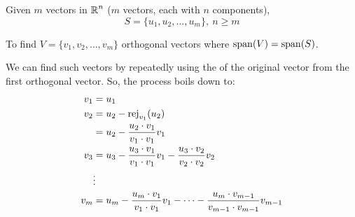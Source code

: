 \begin{theorem}\label{thm:Gram-Schmidt_Orthogonalization}
  Given $m$  vectors in $\RealNumbers^{n}$ ($m$ vectors, each with $n$ components),
  \begin{equation*}
    S = \lbrace u_{1}, u_{2}, \ldots, u_{m} \rbrace, \: n \geq m
  \end{equation*}

  To find $V = \lbrace v_{1}, v_{2}, \ldots, v_{m} \rbrace$ orthogonal vectors where $\Span(V) = \Span(S)$.

  We can find such vectors by repeatedly using the  of the original vector from the first orthogonal vector.
  So, the process boils down to:
  \begin{equation}\label{eq:Gram-Schmidt_Orthogonalization}
    \begin{aligned}
      v_{1} &= u_{1} \\
      v_{2} &= u_{2} - \Rej{u_{2}}{v_{1}} \\
      &= u_{2} - \frac{u_{2} \cdot v_{1}}{v_{1} \cdot v_{1}} v_{1} \\
      v_{3} &= u_{3} - \frac{u_{3} \cdot v_{1}}{v_{1} \cdot v_{1}} v_{1} - \frac{u_{3} \cdot v_{2}}{v_{2} \cdot v_{2}} v_{2} \\
      &\vdots \\
      v_{m} &= u_{m} - \frac{u_{m} \cdot v_{1}}{v_{1} \cdot v_{1}} v_{1} - \cdots - \frac{u_{m} \cdot v_{m-1}}{v_{m-1} \cdot v_{m-1}} v_{m-1}
    \end{aligned}
  \end{equation}
\end{theorem}

